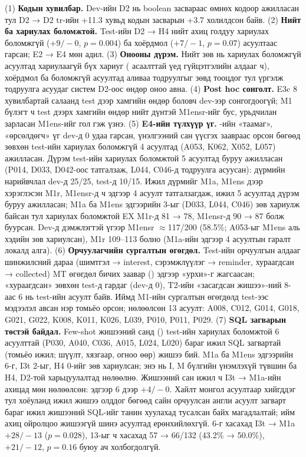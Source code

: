 (1) \textbf{Кодын хувилбар.} Dev-ийн D2 нь boolean засвараас өмнөх кодоор ажилласан тул D2 → D2 tr-ийн +11.3 хувьд кодын
засварын +3.7 холилдсон байв.
(2) \textbf{Нийт ба хариулах боломжтой.} Test-ийн D2 → H4 нийт ахиц голдуу хариулах боломжгүй ($+9/-0$, $p = 0.004$) ба
хоёрдмол ($+7/-1$, $p = 0.07$) асуултаас гарсан; E2 → E4 мөн адил.
(3) \textbf{Онооны дүрэм.} Нийт зөв нь хариулах боломжгүй асуултад хариулаагүй бүх хариуг (
асаалттай үед гүйцэтгэлийн алдааг ч), хоёрдмол ба боломжгүй асуултад аливаа тодруулгыг зөвд тооцдог тул үргэлж тодруулга
асуудаг систем D2-оос өндөр оноо авна.
(4) \textbf{Post hoc сонголт.} E3c 8 хувилбартай салаанд test дээр хамгийн өндөр боловч dev-ээр сонгогдоогүй; M1 бүлэгт ч
test дээрх хамгийн өндөр нийт дүнтэй M1ensr-ийг бус, урьдчилан зарласан M1ens-ийг гол гэж үзнэ.
(5) \textbf{E4-ийн түлхүүр үг.} -ийн «таамаг», «өрсөлдөгч» үг dev-д 0 удаа гарсан, үнэлгээний
сан үүсгэх заавраас орсон бөгөөд зөвхөн test-ийн хариулах боломжгүй 4 асуултад (A053, K062, X052, L057) ажилласан. Дүрэм
test-ийн хариулах боломжтой 5 асуултад буруу ажилласан (P014, D033, D042-оос татгалзаж, L044, C046-д тодруулга асуусан):
дүрмийн нарийвчлал dev-д 25/25, test-д 10/15. Ижил дүрмийг M1a, M1ens дээр хэрэглэсэн M1r, M1ensr-д ч эдгээр 4 асуулт
татгалзагдаж, ижил 5 асуултад дүрэм буруу ажилласан; M1a ба M1ens эдгээрийн 3-ыг (D033, L044, C046) зөв хариулж байсан тул
хариулах боломжтой EX M1r-д 81 → 78, M1ensr-д 90 → 87 болж буурсан. Dev-д дэмжлэгтэй үгээр M1ensr $\approx$117/200 (58.5\%;
A053-ыг M1ens аль хэдийн зөв хариулсан), M1r 109--113 болно (M1a-ийн эдгээр 4 асуултын гаралт локалд алга).
(6) \textbf{Орчуулагчийн сургалтын өгөгдөл.} Test-ийн орчуулгын алдааг шинжилсний дараа (шимтгэл → interest, сэрэмжлүүлэг →
reminder, хураагдсан → collected) MT өгөгдөл бичих заавар () эдгээр «урхи»-г жагсаасан;
«хураагдсан» зөвхөн test-д гардаг (dev-д 0), T2-ийн «засагдсан жишээ»-ний 8-аас 6 нь test-ийн асуулт байв. Иймд M1-ийн сургалтын
өгөгдөлд test-ээс мэдээлэл авсан нэр томьёо орсон; нөлөөлсөн 13 асуулт: A008, C012, G014, G018, G021, G022, K008, K011,
K026, L039, P010, P011, P029.
(7) \textbf{SQL загварын төстэй байдал.} Few-shot жишээний санд () test-ийн хариулах боломжтой 6
асуулттай (P030, A040, C036, A015, L024, L020) бараг ижил SQL загвартай (томьёо ижил; шүүлт, хязгаар, огноо өөр) жишээ бий.
M1a ба M1ens эдгээрийн 6-г, I3t 2-ыг, H4 0-ийг зөв хариулсан; энэ нь I, M бүлгийн үнэмлэхүй түвшин ба H4, D2-той харьцуулалтад
нөлөөлнө. Жишээний сан ижил ч I3t → M1a-ийн ахицад мөн нөлөөлсөн: эдгээр 6 дээр $+4/-0$. Хайлт монгол асуултаар хийгддэг
тул хоёуланд ижил жишээ олддог бөгөөд сайн орчуулсан англи асуулт загварт бараг ижил жишээний SQL-ийг танин хуулахад
тусалсан байх магадлалтай; ийм ахиц ойролцоо жишээгүй шинэ асуултад ерөнхийлөхгүй. 6-г хасахад I3t → M1a $+28/-13$
($p = 0.028$), 13-ыг ч хасахад 57 → 66/132 (43.2\% → 50.0\%), $+21/-12$, $p = 0.16$ буюу ач холбогдолгүй.

